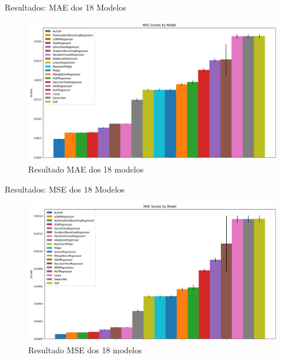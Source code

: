 \documentclass{beamer}
\begin{document}
\begin{frame}{Resultados: MAE dos 18 Modelos}
    \begin{figure}[H]
        \centering
        \includegraphics[width=1\linewidth]{image.png}
        \caption{Resultado MAE dos 18 modelos}
    \end{figure}
\end{frame}

\begin{frame}{Resultados: MSE dos 18 Modelos}
    \begin{figure}[H]
        \centering
        \includegraphics[width=1\linewidth]{image3.png}
        \caption{Resultado MSE dos 18 modelos}
    \end{figure}
\end{frame}
\end{document}
